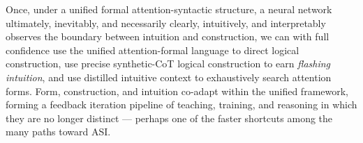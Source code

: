 \documentclass[
]{article}
\begin{document}
Once, under a unified formal attention-syntactic structure, a neural
network ultimately, inevitably, and necessarily clearly, intuitively,
and interpretably observes the boundary between intuition and
construction, we can with full confidence use the unified
attention-formal language to direct logical construction, use precise
synthetic-CoT logical construction to earn \emph{flashing intuition},
and use distilled intuitive context to exhaustively search attention
forms. Form, construction, and intuition co-adapt within the unified
framework, forming a feedback iteration pipeline of teaching, training,
and reasoning in which they are no longer distinct --- perhaps one of
the faster shortcuts among the many paths toward ASI.
\end{document}
